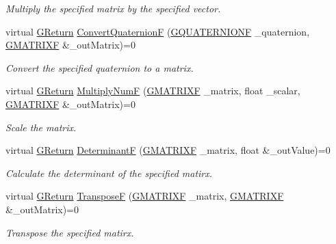 \begin{DoxyCompactItemize}
\begin{DoxyCompactList}\small\item\em Multiply the specified matrix by the specified vector. \end{DoxyCompactList}\item 
virtual \mbox{\hyperlink{namespaceGW_a67a839e3df7ea8a5c5686613a7a3de21}{G\+Return}} \mbox{\hyperlink{classGW_1_1MATH_1_1GMatrix_aded7d8a4b4cd54c3fc7f43bab1ed0730}{Convert\+QuaternionF}} (\mbox{\hyperlink{structGW_1_1MATH_1_1GQUATERNIONF}{G\+Q\+U\+A\+T\+E\+R\+N\+I\+O\+NF}} \+\_\+quaternion, \mbox{\hyperlink{structGW_1_1MATH_1_1GMATRIXF}{G\+M\+A\+T\+R\+I\+XF}} \&\+\_\+out\+Matrix)=0
\begin{DoxyCompactList}\small\item\em Convert the specified quaternion to a matrix. \end{DoxyCompactList}\item 
virtual \mbox{\hyperlink{namespaceGW_a67a839e3df7ea8a5c5686613a7a3de21}{G\+Return}} \mbox{\hyperlink{classGW_1_1MATH_1_1GMatrix_ab2560c150812cd88dd631e533ea5f9dc}{Multiply\+NumF}} (\mbox{\hyperlink{structGW_1_1MATH_1_1GMATRIXF}{G\+M\+A\+T\+R\+I\+XF}} \+\_\+matrix, float \+\_\+scalar, \mbox{\hyperlink{structGW_1_1MATH_1_1GMATRIXF}{G\+M\+A\+T\+R\+I\+XF}} \&\+\_\+out\+Matrix)=0
\begin{DoxyCompactList}\small\item\em Scale the matrix. \end{DoxyCompactList}\item 
virtual \mbox{\hyperlink{namespaceGW_a67a839e3df7ea8a5c5686613a7a3de21}{G\+Return}} \mbox{\hyperlink{classGW_1_1MATH_1_1GMatrix_a8ae14af67e2b099569a4439b7497b37d}{DeterminantF}} (\mbox{\hyperlink{structGW_1_1MATH_1_1GMATRIXF}{G\+M\+A\+T\+R\+I\+XF}} \+\_\+matrix, float \&\+\_\+out\+Value)=0
\begin{DoxyCompactList}\small\item\em Calculate the determinant of the specified matirx. \end{DoxyCompactList}\item 
virtual \mbox{\hyperlink{namespaceGW_a67a839e3df7ea8a5c5686613a7a3de21}{G\+Return}} \mbox{\hyperlink{classGW_1_1MATH_1_1GMatrix_ae1865f48ec9187b508cbcfe083496581}{TransposeF}} (\mbox{\hyperlink{structGW_1_1MATH_1_1GMATRIXF}{G\+M\+A\+T\+R\+I\+XF}} \+\_\+matrix, \mbox{\hyperlink{structGW_1_1MATH_1_1GMATRIXF}{G\+M\+A\+T\+R\+I\+XF}} \&\+\_\+out\+Matrix)=0
\begin{DoxyCompactList}\small\item\em Transpose the specified matirx. \end{DoxyCompactList}\item 

\end{DoxyCompactItemize}
